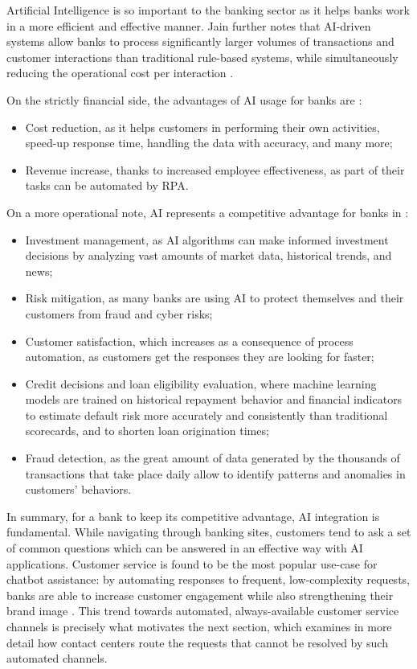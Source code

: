 \documentclass[12pt,a4paper,openright,twoside]{book}
\begin{document}
Artificial Intelligence is so important to the banking sector as it helps banks work in a more efficient and effective manner. Jain further notes that AI-driven systems allow banks to process significantly larger volumes of transactions and customer interactions than traditional rule-based systems, while simultaneously reducing the operational cost per interaction \cite{jain2023role}.

On the strictly financial side, the advantages of AI usage for banks are \cite{fernandez2019artificial, kochhar2019rise}:
\begin{itemize}
    \item Cost reduction, as it helps customers in performing their own activities, speed-up response time, handling the data with accuracy, and many more;
    \item Revenue increase, thanks to increased employee effectiveness, as part of their tasks can be automated by RPA.
\end{itemize} 
On a more operational note, AI represents a competitive advantage for banks in \cite{kochhar2019rise}:
\begin{itemize}
    \item Investment management, as AI algorithms can make informed investment decisions by analyzing vast amounts of market data, historical trends, and news;
    \item Risk mitigation, as many banks are using AI to protect themselves and their customers from fraud and cyber risks;
    \item Customer satisfaction, which increases as a consequence of process automation, as customers get the responses they are looking for faster;
    \item Credit decisions and loan eligibility evaluation, where machine learning models are trained on historical repayment behavior and financial indicators to estimate default risk more accurately and consistently than traditional scorecards, and to shorten loan origination times;
    \item Fraud detection, as the great amount of data generated by the thousands of transactions that take place daily allow to identify patterns and anomalies in customers' behaviors.
\end{itemize}

In summary, for a bank to keep its competitive advantage, AI integration is fundamental. While navigating through banking sites, customers tend to ask a set of common questions which can be answered in an effective way with AI applications. Customer service is found to be the most popular use-case for chatbot assistance: by automating responses to frequent, low-complexity requests, banks are able to increase customer engagement while also strengthening their brand image \cite{bhattacharya2022role}. This trend towards automated, always-available customer service channels is precisely what motivates the next section, which examines in more detail how contact centers route the requests that cannot be resolved by such automated channels.
\end{document}
